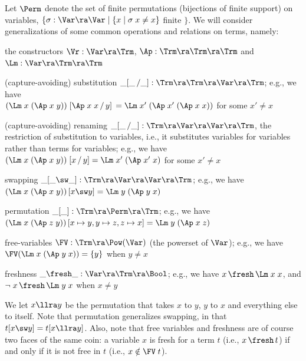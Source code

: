Let $\Perm$ denote the set of finite permutations (bijections of finite support) on %
variables, 
$\{\sigma : \Var \ra \Var \mid 
\{x \mid \sigma\;x \not=x\}$ finite $\}$.
We will consider generalizations of 
some common operations and relations on 
terms, namely: %
\begin{mmyitem}
	\item the constructors 
	$\Vr : \Var \ra \Trm$, $\Ap : \Trm \ra \Trm \ra \Trm$ 
	and $\Lm : \Var \ra \Trm \ra \Trm$ 
	\item (capture-avoiding) substitution  
	$\_[\_\,/\_] : \Trm \ra \Trm \ra \Var \ra \Trm$; 
	e.g., we have 
	\\$(\Lm\;x\;(\Ap\;x\;y))\;[\Ap\;x\;x \,/\, y] \,= \Lm\;x'\;(\Ap\;x'\;(\Ap\;x\;x))$ for some $x'\not= x$
	\item (capture-avoiding) renaming  
	$\_[\_\,/\_] : \Trm \ra \Var \ra \Var \ra \Trm$,  
    the restriction of substitution to variables, i.e., it substitutes 
	variables for variables rather than terms for variables; 
	e.g., we have $(\Lm\;x\;(\Ap\;x\;y))\;[x \,/\, y] = \Lm\;x'\;(\Ap\;x'\;x)$ for some $x'\not= x$ 
	\item swapping  
	$\_[\_\sw\_] : \Trm \ra \Var \ra \Var \ra \Trm$; 
	e.g., we have %
	$(\Lm\;x\;(\Ap\;x\;y))\,[x \sw y] = 
	\Lm\;y\;(\Ap\;y\;x)$
	\item permutation $\_[\_] : \Trm \ra \Perm \ra \Trm$; 
	e.g., we have %
	$(\Lm\;x\;(\Ap\;z\;y))\,[x \mapsto y,y\mapsto z,z\mapsto x] = 
	\Lm\;y\;(\Ap\;x\;z)$
	\item free-variables %
	$\FV : \Trm \ra \Pow(\Var)$ (the powerset of $\Var$); 
	e.g., %
	we have $\FV (\Lm\;x\;(\Ap\;y\;x)) = \{y\}$ when $y\not=x$
	\item freshness $\_\fresh\_ : \Var \ra \Trm \ra \Bool$; 
	e.g., %
	we have $x \,\fresh\, \Lm\;x\;x$, and $\neg\;x \,\fresh\, \Lm\;y\;x$ when $x\not=y$
\end{mmyitem}  


 We let $x \llra y$ be the 
permutation %
 that takes $x$ to $y$, $y$ to $x$ and everything else to itself. 
%
Note that permutation generalizes swapping, in that $t [x \sw y] = t [x \llra y]$. 
Also, note that free variables and freshness are of course two faces of the same coin: a variable $x$ is fresh for a term $t$ (i.e., $x \,\fresh\, t$) 
 if and only if it is not free in $t$ (i.e., $x \notin \FV\;t$). 

